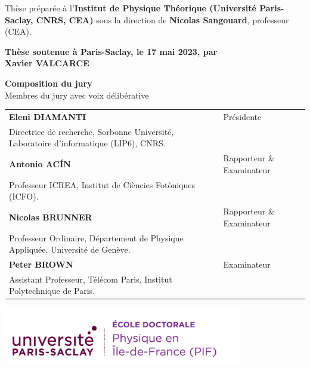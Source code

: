 \documentclass[french,12pt,a4paper]{book}
\begin{document}
\begin{titlepage}
		\footnotesize Thèse préparée à l’\textbf{Institut de Physique Théorique (Université Paris-Saclay, CNRS, CEA)} sous la direction de \textbf{Nicolas Sangouard}, professeur (CEA). \\
		\vspace{15mm}
		
		\textbf{Thèse soutenue à Paris-Saclay, le 17 mai 2023, par}\\
		\bigskip
		\Large {\color{Prune} \textbf{Xavier VALCARCE}}
		
		\vspace{\fill} %
		
		\bigskip
		
		\flushleft
		\small \textbf{Composition du jury}\\
		\vspace{2mm}
		\small Membres du jury avec voix délibérative \\
		\vspace{2mm}
		\scriptsize
		\begin{tabular}{|p{7cm}l}
			\arrayrulecolor{Prune}
			\textbf{Eleni DIAMANTI} & Présidente\\ 
			Directrice de recherche, Sorbonne Université, Laboratoire d'informatique (LIP6), CNRS. & \\
			\textbf{Antonio AC\'IN} &  Rapporteur \& Examinateur \\ 
			Professeur ICREA, Institut de Ciències Fotòniques (ICFO).   &   \\ 
			\textbf{Nicolas BRUNNER} &  Rapporteur \& Examinateur \\ 
			Professeur Ordinaire, Département de Physique Appliquée, Université de Genève.  &   \\ 
			\textbf{Peter BROWN} &  Examinateur \\ 
			Assistant Professeur, Télécom Paris, Institut Polytechnique de Paris.   &  
		\end{tabular} 
		
	\end{titlepage}

\Ifthispageodd{\newpage\thispagestyle{empty}\null\newpage}{}
\thispagestyle{empty}
\selectfont

\lhead{}
\rhead{}
\rfoot{}
\cfoot{}
\lfoot{}

\noindent 
\includegraphics[height=2.45cm]{Logo/logo_usp_PIF.png}
\vspace{.5cm}
\selectfont
\end{document}
